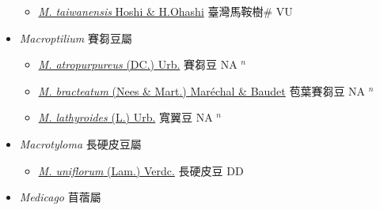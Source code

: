 \begin{itemize}
  \begin{itemize}
        \item[] \href{http://www.theplantlist.org/tpl1.1/search?q=Maackia+taiwanensis}{\textit{M. taiwanensis} Hoshi \& H.Ohashi}   臺灣馬鞍樹\# VU
  \end{itemize}
 \item[] \textit{Macroptilium} 賽芻豆屬
                    
  \begin{itemize}
        \item[] \href{http://www.theplantlist.org/tpl1.1/search?q=Macroptilium+atropurpureus}{\textit{M. atropurpureus} (DC.) Urb.}   賽芻豆 NA $^n$
        \item[] \href{http://www.theplantlist.org/tpl1.1/search?q=Macroptilium+bracteatum}{\textit{M. bracteatum} (Nees \& Mart.) Maréchal \& Baudet}   苞葉賽芻豆 NA $^n$
        \item[] \href{http://www.theplantlist.org/tpl1.1/search?q=Macroptilium+lathyroides}{\textit{M. lathyroides} (L.) Urb.}   寬翼豆 NA $^n$
  \end{itemize}
 \item[] \textit{Macrotyloma} 長硬皮豆屬
                    
  \begin{itemize}
        \item[] \href{http://www.theplantlist.org/tpl1.1/search?q=Macrotyloma+uniflorum}{\textit{M. uniflorum} (Lam.) Verdc.}   長硬皮豆 DD
  \end{itemize}
 \item[] \textit{Medicago} 苜蓿屬
                    

\end{itemize}
